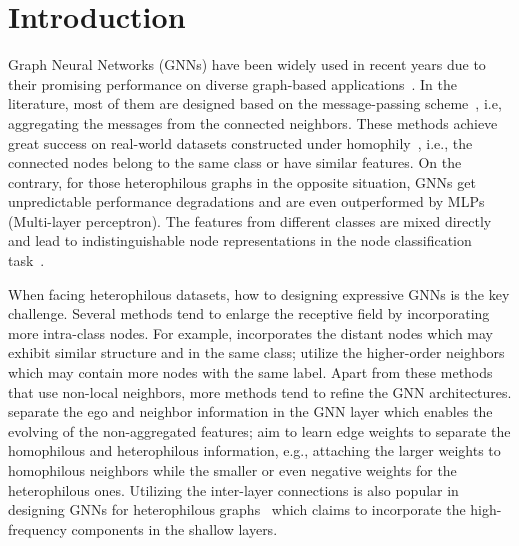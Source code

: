 \documentclass[sigconf]{acmart}
\begin{document}
\maketitle
\section{Introduction}
Graph Neural Networks (GNNs) have been widely used in recent years due to their promising performance on diverse graph-based applications~\cite{kipf2016semi,ying2018hierarchical}. In the literature, most of them are designed based on the message-passing scheme~\cite{gilmer2017neural}, i.e, aggregating the messages from the connected neighbors. These methods achieve great success on real-world datasets constructed under homophily~\cite{zhu2020beyond}, i.e., the connected nodes belong to the same class or have similar features. On the contrary, for those heterophilous graphs in the opposite situation, GNNs get unpredictable performance degradations and are even outperformed by MLPs (Multi-layer perceptron).  The features from different classes are mixed directly and lead to indistinguishable node representations in the node classification task~\cite{zhu2020beyond}. 

When facing heterophilous datasets, how to designing expressive GNNs is the key challenge. Several methods tend to enlarge the receptive field by incorporating more intra-class nodes. For example, \cite{pei2020geom,suresh2021breaking} incorporates the distant nodes which may exhibit similar structure and in the same class; \cite{zhu2020beyond,jin2021universal} utilize the higher-order neighbors which may contain more nodes with the same label. Apart from these methods that use non-local neighbors, more methods tend to refine the GNN architectures.  \cite{zhu2020beyond,hamilton2017inductive} separate the ego and neighbor information in the GNN layer which enables the evolving of the non-aggregated features; 
\cite{du2022gbk,yan2021two,bo2021beyond} aim to learn edge weights to separate the homophilous and heterophilous information, e.g., attaching the larger weights to homophilous neighbors while the smaller or even negative weights for the heterophilous ones.
Utilizing the inter-layer connections is also popular in designing GNNs for heterophilous graphs~\cite{zhu2020beyond,chien2020adaptive} which claims to incorporate the high-frequency components in the shallow layers.
\end{document}
